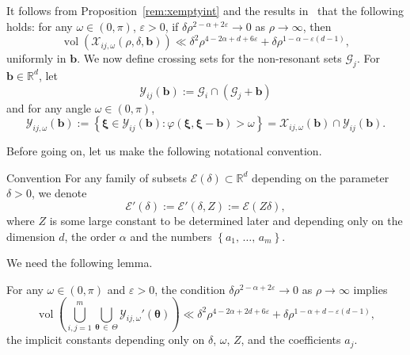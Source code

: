\documentclass[AHL,Unicode,longabstracts,published]{cedram}
\DeclareMathOperator{\vol}{vol}
\newcommand{\R}{\mathbb R}
\newcommand{\CE}{\mathcal{E}}
\newcommand{\CG}{\mathcal{G}}
\newcommand{\CX}{\mathcal{X}}
\newcommand{\CY}{\mathcal{Y}}
\newcommand{\btheta}{\boldsymbol \theta}
\newcommand{\bxi}{\boldsymbol \xi}
\newcommand{\bb}{\mathbf b}
\newcommand{\bbb}{\mathbf b}
\renewcommand{\phi}{\varphi}
\newcommand{\eps}{\varepsilon}
\newcommand{\set}[1]{\left\{ #1 \right\}}
\begin{document}
It follows from Proposition~\ref{rem:xemptyint} and the results in~\cite[Section~9]{ParSob2010} that the following holds: for any $\omega \in (0,\pi)$, $\eps > 0$, if $\delta \rho^{2 - \alpha + 2 \eps} \to 0$ as $\rho \to \infty$, then
\begin{equation}\label{eq:nokissmu}
\vol\left(\CX_{ij,\omega}(\rho,\delta,\bb)\right) \ll \delta^2 \rho^{4 - 2\alpha + d + 6\eps} + \delta \rho^{1 - \alpha - \eps(d-1)},
\end{equation}
uniformly in $\bb$. We now define crossing sets for the non-resonant sets $\CG_j$. For $\bbb \in
\R^d$, let
\begin{equation}
\CY_{ij}(\bb) := \CG_{i} \cap (\CG_j +
\bb)
\end{equation}
and for any angle $\omega \in (0,\pi)$,
\begin{equation}
\CY_{ij,\omega}(\bb) := \set{\bxi \in \CY_{ij}(\bbb) : \phi(\bxi,\bxi-\bb) > \omega} = \CX_{ij,\omega}(\bbb) \cap \CY_{ij}(\bbb).
\end{equation}

Before going on, let us make the following notational convention.

\begin{enonce*}
{Convention}
For any family of subsets $\CE(\delta) \subset \R^d$ depending on the parameter $\delta > 0$, we denote
\[
\CE'(\delta) := \CE'(\delta,Z) := \CE(Z\delta),
\]
where $Z$ is some large constant to be determined later and depending only on the dimension $d$, the order $\alpha$ and the numbers $\set{a_1,\,\dotsc,\,a_m}$.
\end{enonce*}

We need the following lemma.
\begin{lemm} \label{lem:totalintersection}
For any $\omega \in (0,\pi)$ and $\eps > 0$, the condition $\delta \rho^{2 -
\alpha + 2\eps} \to 0$ as $\rho \to \infty$ implies
\begin{equation}
\vol\left(\bigcup_{i,j = 1}^m \bigcup_{\btheta\,\in\,\Theta}
\CY_{ij,\omega}'(\btheta) \right) \ll
\delta^2 \rho^{4 - 2\alpha + 2 d +6\eps} + \delta \rho^{1- \alpha + d - \eps(d-1)},\label{eq:sobranie}
\end{equation}
the implicit constants depending only on $\delta$, $\omega$, $Z$, and the coefficients $a_j$.
\end{lemm}
\end{document}
